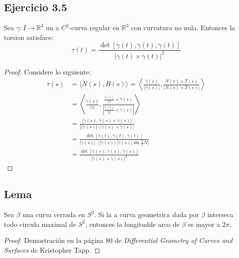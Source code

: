 \documentclass[12pt]{article}
\begin{document}
\subsection*{Ejercicio 3.5}
Sea $\gamma : I \rightarrow \mathbb{R}^3$ un a $C^2$-curva regular en $\mathbb{R}^3$ con curvatura no nula. Entonces la torsion satisface:
\begin{equation*}
\tau (t)=\frac{\det [\dot{\gamma}(t), \ddot{\gamma}(t),\dddot{\gamma}(t)]}{|\dot{\gamma}(t) \times \ddot{\gamma}(t)|^2 }
\end{equation*}
\begin{proof}
Considere lo siguiente:
\begin{equation*}
  \begin{split}
    \tau(s)&=\langle \dot{N}(s), B(s) \rangle = \left\langle\frac{\dddot{\gamma}(s)}{|\ddot{\gamma}(s)|}, \frac{N(s)\times T(s)}{|N(s)\times T(s)|}\right\rangle \\
     &=\left\langle \frac{\dddot{\gamma}(s)}{|\ddot{\gamma}|}, \frac{\frac{\ddot{\gamma}(s)}{|\ddot{\gamma}|}\times \dot{\gamma}(s)}{|\frac{\ddot{\gamma}(s)}{|\ddot{\gamma}|}\times \dot{\gamma}(s)|}\right\rangle \\
     &=\frac{\langle \dddot{\gamma}(s), \ddot{\gamma}(s)\times \dot{\gamma}(s)\rangle}{|\langle \dddot{\gamma}(s)| \cdot |\ddot{\gamma}(s)\times \dot{\gamma}(s)|} \\
     &=\frac{\det [\dot{\gamma}(t), \ddot{\gamma}(t),\dddot{\gamma}(t)]}{|\dddot{\gamma}(s)|\cdot||\ddot{\gamma}(s)|\cdot |\dot{\gamma}(s)| \sin \frac{\pi}{2}N|}\\
     &=\frac{\det [\dot{\gamma}(s), \ddot{\gamma}(s),\dddot{\gamma}(s)]}{|\dot{\gamma}(s) \times \ddot{\gamma}(s)|^2 }
  \end{split}
\end{equation*}



\end{proof}
\subsection*{Lema}
Sea $\beta$ una curva cerrada en $S^2$. Si la a curva geometrica dada por $\beta$ interseca todo circulo maximal de $S^2$, entonces la longitudde arco de $\beta$ es mayor a $2\pi$,

\begin{proof}
  Demostraci\'on en la p\'agina 80  de   \textit{Differential Geometry of Curves and Surfaces} de Kristopher Tapp.
\end{proof}
\end{document}
